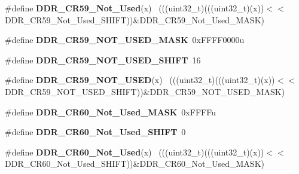 \begin{DoxyCompactItemize}
\item 
\hypertarget{group___d_d_r___register___masks_ga7b67fd50e9c9a44c423f1cf1b9edec79}{}\#define {\bfseries D\+D\+R\+\_\+\+C\+R59\+\_\+\+Not\+\_\+\+Used}(x)                                      ~(((uint32\+\_\+t)(((uint32\+\_\+t)(x))$<$$<$D\+D\+R\+\_\+\+C\+R59\+\_\+\+Not\+\_\+\+Used\+\_\+\+S\+H\+I\+F\+T))\&D\+D\+R\+\_\+\+C\+R59\+\_\+\+Not\+\_\+\+Used\+\_\+\+M\+A\+S\+K)\label{group___d_d_r___register___masks_ga7b67fd50e9c9a44c423f1cf1b9edec79}

\item 
\hypertarget{group___d_d_r___register___masks_ga1dbc2f625620e20201b79887c1782e2e}{}\#define {\bfseries D\+D\+R\+\_\+\+C\+R59\+\_\+\+N\+O\+T\+\_\+\+U\+S\+E\+D\+\_\+\+M\+A\+S\+K}~0x\+F\+F\+F\+F0000u\label{group___d_d_r___register___masks_ga1dbc2f625620e20201b79887c1782e2e}

\item 
\hypertarget{group___d_d_r___register___masks_gae19496be4aca332c29a2aacef3668bd1}{}\#define {\bfseries D\+D\+R\+\_\+\+C\+R59\+\_\+\+N\+O\+T\+\_\+\+U\+S\+E\+D\+\_\+\+S\+H\+I\+F\+T}~16\label{group___d_d_r___register___masks_gae19496be4aca332c29a2aacef3668bd1}

\item 
\hypertarget{group___d_d_r___register___masks_gabc23711198de73c836f0d3842c74ca6e}{}\#define {\bfseries D\+D\+R\+\_\+\+C\+R59\+\_\+\+N\+O\+T\+\_\+\+U\+S\+E\+D}(x)                                      ~(((uint32\+\_\+t)(((uint32\+\_\+t)(x))$<$$<$D\+D\+R\+\_\+\+C\+R59\+\_\+\+N\+O\+T\+\_\+\+U\+S\+E\+D\+\_\+\+S\+H\+I\+F\+T))\&D\+D\+R\+\_\+\+C\+R59\+\_\+\+N\+O\+T\+\_\+\+U\+S\+E\+D\+\_\+\+M\+A\+S\+K)\label{group___d_d_r___register___masks_gabc23711198de73c836f0d3842c74ca6e}

\item 
\hypertarget{group___d_d_r___register___masks_ga586193a59348eb584646145079b64bf2}{}\#define {\bfseries D\+D\+R\+\_\+\+C\+R60\+\_\+\+Not\+\_\+\+Used\+\_\+\+M\+A\+S\+K}~0x\+F\+F\+F\+Fu\label{group___d_d_r___register___masks_ga586193a59348eb584646145079b64bf2}

\item 
\hypertarget{group___d_d_r___register___masks_ga784206d5118843708089d1f20665d941}{}\#define {\bfseries D\+D\+R\+\_\+\+C\+R60\+\_\+\+Not\+\_\+\+Used\+\_\+\+S\+H\+I\+F\+T}~0\label{group___d_d_r___register___masks_ga784206d5118843708089d1f20665d941}

\item 
\hypertarget{group___d_d_r___register___masks_gabaa825cf9871f35348c63e5bdd225b34}{}\#define {\bfseries D\+D\+R\+\_\+\+C\+R60\+\_\+\+Not\+\_\+\+Used}(x)                                      ~(((uint32\+\_\+t)(((uint32\+\_\+t)(x))$<$$<$D\+D\+R\+\_\+\+C\+R60\+\_\+\+Not\+\_\+\+Used\+\_\+\+S\+H\+I\+F\+T))\&D\+D\+R\+\_\+\+C\+R60\+\_\+\+Not\+\_\+\+Used\+\_\+\+M\+A\+S\+K)\label{group___d_d_r___register___masks_gabaa825cf9871f35348c63e5bdd225b34}


\end{DoxyCompactItemize}
